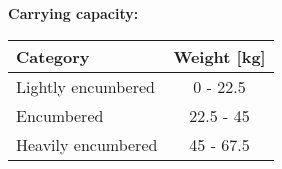 \documentclass[11pt]{article}
\begin{document}
\vspace{15mm}

\textbf{Carrying capacity:} \\

	\begin{tabular}{l|c}
Category & Weight [kg] \\
\hline
Lightly encumbered 	& 0 - 22.5 	\\
Encumbered 			& 22.5 - 45 \\
Heavily encumbered	& 45 - 67.5
	\end{tabular}
\end{document}
